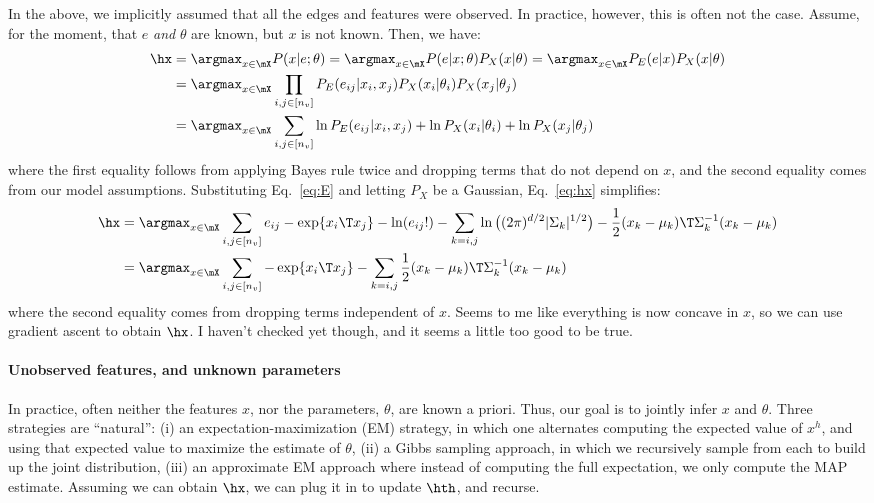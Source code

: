 In the above, we implicitly assumed that all the edges and features were observed.  In practice, however, this is often not the case.  Assume, for the moment, that $e$ \emph{and} $\theta$ are known, but $x$ is not known.  Then, we have:
\begin{align} \label{eq:hx}
	\hx &= \argmax_{x \in \mX} P(x|e;\theta) = \argmax_{x \in \mX} P(e|x;\theta) P_X(x|\theta) = \argmax_{x \in \mX} 
	 P_E(e|x) P_X(x|\theta) \nonumber \\
	&= \argmax_{x \in \mX} \prod_{i,j \in [n_v]} P_E(e_{ij}|x_i,x_j) P_X(x_i | \theta_i) P_X(x_j|\theta_j) \nonumber \\
	&= \argmax_{x \in \mX} \sum_{i,j \in [n_v]} \ln P_E(e_{ij}|x_i,x_j) + \ln P_X(x_i | \theta_i) + \ln  P_X(x_j|\theta_j) 
\end{align}
where the first equality follows from applying Bayes rule twice and dropping terms that do not depend on $x$, and the second equality comes from our model assumptions.  Substituting Eq.~\eqref{eq:E} and letting $P_X$ be a Gaussian, Eq.~\eqref{eq:hx} simplifies:
\begin{align} \label{eq:hx2}
	\hx &= \argmax_{x \in \mX} \sum_{i,j \in [n_v]} e_{ij} - \exp\{x_i\T x_j\} - \ln (e_{ij}!) - \sum_{k=i,j} \ln \big((2\pi)^{d/2} |\Sigma_k|^{1/2}\big) - \frac{1}{2} (x_k-\mu_k)\T \Sigma_k^{-1} (x_k-\mu_k) \nonumber \\
	&= \argmax_{x \in \mX} \sum_{i,j \in [n_v]} -\exp\{x_i\T x_j\} - \sum_{k=i,j}\frac{1}{2} (x_k-\mu_k)\T \Sigma_k^{-1} (x_k-\mu_k)
\end{align}
where the second equality comes from dropping terms independent of $x$.  Seems to me like everything is now concave in $x$, so we can use gradient ascent to obtain $\hx$.  I haven't checked yet though, and it seems a little too good to be true.




\paragraph{Unobserved features, and unknown parameters}

In practice, often neither the features $x$, nor the parameters, $\theta$, are known a priori.  Thus, our goal is to jointly infer $x$ and $\theta$.  Three strategies are ``natural'': (i) an expectation-maximization (EM) strategy, in which one alternates computing the expected value of $x^h$, and using that expected value to maximize the estimate of $\theta$, (ii) a Gibbs sampling approach, in which we recursively sample from each to build up the joint distribution, (iii) an approximate EM approach where instead of computing the full expectation, we only compute the MAP estimate.  Assuming we can obtain $\hx$, we can plug it in to update $\hth$, and recurse.

